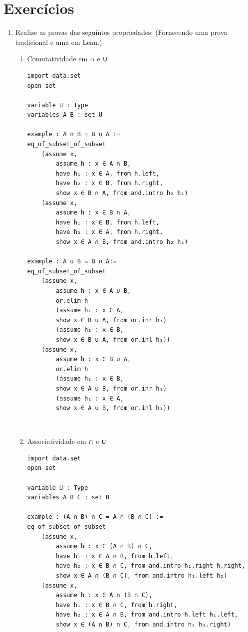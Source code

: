 \section{Exercícios}
\begin{enumerate}
    
\item Realize as provas das seguintes propriedades: (Fornecendo uma prova tradicional e uma em Lean.)

\begin{enumerate}

\item Comutatividade em ∩ e ∪ 
\begin{lstlisting}
import data.set
open set

variable U : Type
variables A B : set U
 
example : A ∩ B = B ∩ A := 
eq_of_subset_of_subset
    (assume x,
        assume h : x ∈ A ∩ B,
        have h₁ : x ∈ A, from h.left,
        have h₂ : x ∈ B, from h.right,
        show x ∈ B ∩ A, from and.intro h₂ h₁)
    (assume x,
        assume h : x ∈ B ∩ A,
        have h₁ : x ∈ B, from h.left,
        have h₂ : x ∈ A, from h.right,
        show x ∈ A ∩ B, from and.intro h₂ h₁)

example : A ∪ B = B ∪ A:=
eq_of_subset_of_subset
    (assume x,
        assume h : x ∈ A ∪ B,
        or.elim h
        (assume h₁ : x ∈ A,
        show x ∈ B ∪ A, from or.inr h₁)
        (assume h₁ : x ∈ B,
        show x ∈ B ∪ A, from or.inl h₁))
    (assume x,
        assume h : x ∈ B ∪ A,
        or.elim h
        (assume h₁ : x ∈ B,
        show x ∈ A ∪ B, from or.inr h₁)
        (assume h₁ : x ∈ A,
        show x ∈ A ∪ B, from or.inl h₁)) \end{lstlisting}

$\qquad$
\item Associatividade em ∩ e ∪ 
\begin{lstlisting}
import data.set
open set

variable U : Type
variables A B C : set U
 
example : (A ∩ B) ∩ C = A ∩ (B ∩ C) :=
eq_of_subset_of_subset
    (assume x,
        assume h : x ∈ (A ∩ B) ∩ C,
        have h₁ : x ∈ A ∩ B, from h.left,
        have h₂ : x ∈ B ∩ C, from and.intro h₁.right h.right,
        show x ∈ A ∩ (B ∩ C), from and.intro h₁.left h₂) 
    (assume x,
        assume h : x ∈ A ∩ (B ∩ C),
        have h₁ : x ∈ B ∩ C, from h.right,
        have h₂ : x ∈ A ∩ B, from and.intro h.left h₁.left,
        show x ∈ (A ∩ B) ∩ C, from and.intro h₂ h₁.right) 


\end{lstlisting}
\end{enumerate}
\end{enumerate}
